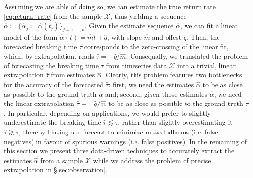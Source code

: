 \documentclass[11pt,a4paper]{article}
\theoremstyle{plain}
\theoremstyle{definition}
\theoremstyle{remark}
\begin{document}
Assuming we are able of doing so, we can estimate the true return rate \eqref{eq:return_rate} from the sample $\mathcal{X}$, thus yielding a sequence $\hat{\alpha}\coloneqq\{\hat\alpha_j\coloneqq\hat\alpha(t_j)\}_{j=1,\dots,n}$.
Given the estimate sequence $\hat\alpha$, we can fit a linear model of the form $\hat\alpha(t) = \hat m t + \hat q$, with slope $\hat m$ and offest $\hat q$. 
Then, the forecasted breaking time $\hat\tau$ corresponds to the zero-crossing of the linear fit, which, by extrapolation, reads $\hat\tau = -\hat q/\hat m$.
Consequally, we translated the problem of forecasting the breaking time $\tau$ from timeseries data $\mathcal{X}$ into a trivial, linear extrapolation $\hat\tau$ from estimates $\hat\alpha$.
Clearly, this problem features two bottlenecks for the accuracy of the forecasted $\hat\tau$: first, we need the estimates $\hat\alpha$  to be as close as possible to the ground truth $\alpha$ and; second, given those estimates $\hat\alpha$, we need the linear extrapolation $\hat\tau=-\hat q/\hat m$ to be as close as possible to the ground truth $\tau$.
In particular, depending on applications, we would prefer to slightly underestimate the breaking time $\hat\tau\lesssim\tau$, rather than slightly overestimating it $\hat\tau\gtrsim\tau$, thereby biasing our forecast to minimize missed allarms (i.e. false negatives) in favour of spurious warnings (i.e. false positives).
In the remaining of this section we present three data-driven techniques to accurately extract the estimates $\hat\alpha$ from a sample $\mathcal{X}$ while we address the problem of precise extrapolation in \S\ref{sec:observation}.
\end{document}

